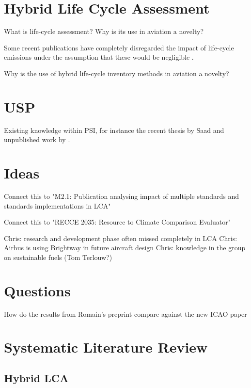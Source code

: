 \documentclass{article}
\begin{document}
\section{Hybrid Life Cycle Assessment}

	What is life-cycle assessment?
	Why is its use in aviation a novelty?
	
	Some recent publications have completely disregarded the impact of life-cycle emissions under the assumption that these would be negligible \cite{brazzola_definitions_2022}.
	
	Why is the use of hybrid life-cycle inventory methods in aviation a novelty?
	
\section{USP}
	
    Existing knowledge within PSI, for instance the recent thesis by Saad \cite{saad_synthetic_2022} and unpublished work by \cite{sacchi_climate-neutral_2022}.

\section{Ideas}

    Connect this to "M2.1: Publication analysing impact of multiple standards and standards implementations in LCA"

    Connect this to "RECCE 2035: Resource to Climate Comparison Evaluator"

	Chris: research and development phase often missed completely in LCA
	Chris: Airbus is using Brightway in future aircraft design
	Chris: knowledge in the group on sustainable fuels (Tom Terlouw?)
	

\section{Questions}

How do the results from Romain's preprint \cite{sacchi_climate-neutral_2022} compare against the new ICAO paper \cite{prussi_corsia_2021}

\newpage
\section{Systematic Literature Review}


    \subsection{Hybrid LCA}
        
\end{document}
